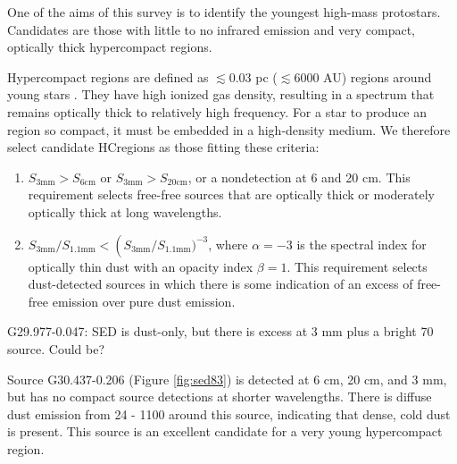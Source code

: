 \documentclass[twocolumn]{aastex62}
\begin{document}
One of the aims of this survey is to identify the youngest high-mass
protostars.  Candidates are those with little to no infrared emission and very
compact, optically thick hypercompact \hii regions.

Hypercompact \hii regions are defined as $\lesssim0.03$ pc ($\lesssim6000$ AU)
\hii regions around young stars \citep{Kurtz2005b}.  They have high ionized
gas density, resulting in a spectrum that remains optically thick to relatively
high frequency.  For a star to produce an \hii region so compact, it must be
embedded in a high-density medium.  We therefore select candidate HC\hii regions
as those fitting these criteria:
\begin{enumerate}
    \item $S_{3 \mathrm{mm}} > S_{6 \mathrm{cm}}$ or $S_{3 \mathrm{mm}} > S_{20 \mathrm{cm}}$,
        or a nondetection at 6 and 20 cm.  This requirement selects free-free sources that are optically
        thick or moderately optically thick at long wavelengths.
    \item $S_{3 \mathrm{mm}} / S_{1.1 \mathrm{mm}} < \left(S_{3
        \mathrm{mm}} / S_{1.1 \mathrm{mm}})^{-3}$,  where $\alpha=-3$ is the
        spectral index for optically thin dust with an opacity index $\beta=1$.
        This requirement selects dust-detected sources in which there is some
        indication of an excess of free-free emission over pure dust emission.
\end{enumerate}

G29.977-0.047: SED is dust-only, but there is excess at 3 mm plus a bright 70 \um source.  Could be?


Source G30.437-0.206 (Figure \ref{fig:sed83}) is detected at 6 cm, 20 cm, and 3
mm, but has no compact source detections at shorter wavelengths.  There is
diffuse dust emission from 24 - 1100 \um around this source, indicating that
dense, cold dust is present.  This source is an excellent candidate for a very
young hypercompact \hii region.
\end{document}
